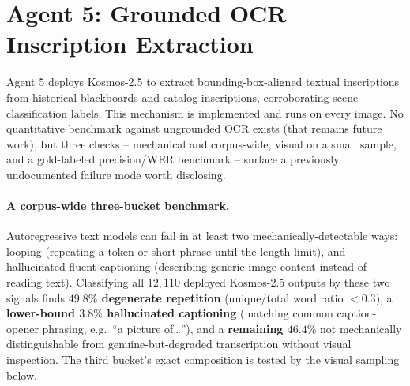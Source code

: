 \documentclass[12pt,a4paper]{report}
\begin{document}
\section{Agent 5: Grounded OCR Inscription Extraction}
\label{sec:agent5_ocr}
Agent 5 deploys Kosmos-2.5 to extract bounding-box-aligned textual inscriptions from historical blackboards and catalog inscriptions, corroborating scene classification labels. This mechanism is implemented and runs on every image. No quantitative benchmark against ungrounded OCR exists (that remains future work), but three checks -- mechanical and corpus-wide, visual on a small sample, and a gold-labeled precision/WER benchmark -- surface a previously undocumented failure mode worth disclosing.

\paragraph{A corpus-wide three-bucket benchmark.} Autoregressive text models can fail in at least two mechanically-detectable ways: looping (repeating a token or short phrase until the length limit), and hallucinated fluent captioning (describing generic image content instead of reading text). Classifying all $12{,}110$ deployed Kosmos-2.5 outputs by these two signals finds \textbf{$49.8\%$ degenerate repetition} (unique/total word ratio $<0.3$), a \textbf{lower-bound $3.8\%$ hallucinated captioning} (matching common caption-opener phrasing, e.g.\ ``a picture of\ldots''), and a \textbf{remaining $46.4\%$} not mechanically distinguishable from genuine-but-degraded transcription without visual inspection. The third bucket's exact composition is tested by the visual sampling below.
\end{document}
